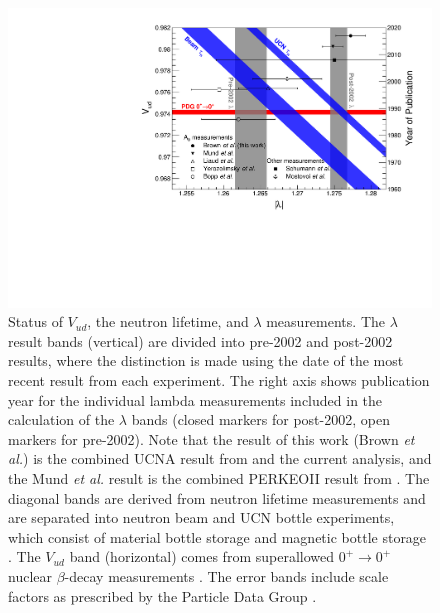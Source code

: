 \begin{figure}[h]
\centering
\includegraphics[scale=.6]{5-UCNAResults/vud_vs_lambda_color.pdf}
\caption{Status of $V_{ud}$, the neutron lifetime, and $\lambda$
  measurements. The $\lambda$
  result bands (vertical) are divided into pre-2002 \cite{bopp1986,yerozolimsky1997,liaud1997}
  and post-2002 \cite{mostovoi2001,schumann2008,mund2013,mendenhall2013}
  results, where the distinction is made using the date of the
  most recent result from each experiment. The right axis
  shows publication year for the individual lambda measurements 
  included in the calculation of the $\lambda$ bands (closed markers for post-2002,
  open markers for pre-2002). Note that the result of this work (Brown \textit{et al.})
  is the combined UCNA result from \cite{mendenhall2013} and the current analysis, and the
  Mund \textit{et al.} result is the combined PERKEOII result from \cite{abele2002,mund2013}.
  The diagonal bands
  are derived from neutron lifetime measurements 
  and are separated into neutron beam \cite{yue2013,byrne1996} and UCN bottle
  experiments, which consist of material bottle storage \cite{serebrov2005,
    arzumanov2015,steyerl2012,pichlmaier2010,mampe1993} and magnetic bottle storage \cite{pattie2017}.
  The $V_{ud}$ band (horizontal) comes from
  superallowed $0^+ \rightarrow 0^+$ nuclear $\beta$-decay
  measurements \cite{pdg}. The error bands include scale factors
  as prescribed by the Particle Data Group \cite{pdg}.}
\label{fig:vud_vs_lambda}
\end{figure}

